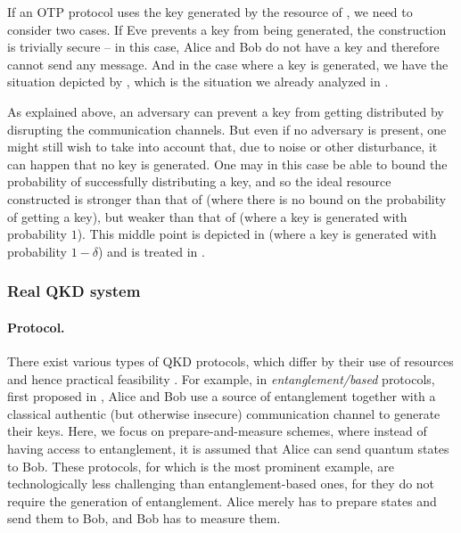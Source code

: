 If an OTP protocol uses the key generated by the resource of
, we need to consider two cases. If
Eve prevents a key from being generated, the construction is trivially
secure \--- in this case, Alice and Bob do not have a key and
therefore cannot send any message. And in the case where a key
is generated, we have the situation depicted by
, which is the situation we already
analyzed in .

As explained above, an adversary can prevent a key from getting
distributed by disrupting the communication channels. But even if no
adversary is present, one might still wish to take into account that,
due to noise or other disturbance, it can happen that no key is
generated. One may in this case be able to bound the probability of
successfully distributing a key, and so the ideal resource constructed
is stronger than that of  (where there
is no bound on the probability of getting a key), but weaker than that
of  (where a key is generated with
probability $1$). This middle point is depicted in
 (where a key is generated
with probability $1-\delta$) and is treated in
.


\subsubsection{Real QKD system}
\label{sec:qkd.protocol}

\paragraph{Protocol.}
There exist various types of QKD protocols, which differ by their use of resources and hence practical feasibility \cite{SBCDLP09}. For example, in \emph{entanglement\-/based} protocols, first proposed in \textcite{Eke91}, Alice and Bob use a source of entanglement together with a classical authentic (but otherwise insecure) communication channel to generate their keys. Here, we focus on prepare-and-measure schemes, where instead of having access to entanglement, it is assumed that Alice can send quantum states to Bob. These protocols, for which  \textcite{BB84} is the most prominent example, are technologically less challenging than entanglement-based ones, for they do not require the generation of entanglement. Alice merely has to prepare states and send them to Bob, and Bob has to measure them. 

